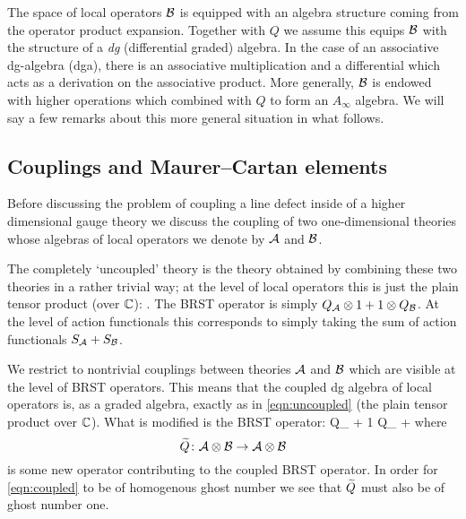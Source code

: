 \documentclass[11pt]{amsart}
\begin{document}
The space of local operators $\mathcal B$ is equipped with an algebra structure coming from the operator product expansion. 
Together with $Q$ we assume this equips $\mathcal B$ with the structure of a {\em dg} (differential graded) algebra. In the case of an associative dg-algebra (dga), there is an associative multiplication and a differential which acts as a derivation on the associative product. 
More generally, $\mathcal B$ is endowed with higher operations which combined with $Q$ to form an $A_\infty$ algebra. 
We will say a few remarks about this more general situation in what follows. 



\subsection{Couplings and Maurer--Cartan elements} 

Before discussing the problem of coupling a line defect inside of a higher dimensional gauge theory we discuss the coupling of two one-dimensional theories whose algebras of local operators we denote by $\mathcal A$ and $\mathcal B$. 

The completely `uncoupled' theory is the theory obtained by combining these two 
theories in a rather trivial way; at the level of local operators this is just the plain tensor product (over $\mathbb C$):
\beqn\label{eqn:uncoupled}
\cA \otimes \cB .
\eeqn
The BRST operator is simply $Q_\mathcal A \otimes 1 + 1 \otimes Q_\mathcal B$.
At the level of action functionals this corresponds to simply taking the sum of action functionals $S_{\mathcal A} + S_{\mathcal B}$. 

We restrict to nontrivial couplings between theories $\mathcal A$ and $\mathcal B$ which are visible at the level of BRST operators. 
This means that the coupled dg algebra of local operators is, as a graded algebra, exactly as in \eqref{eqn:uncoupled} (the plain tensor product over $\mathbb C$). 
What is modified is the BRST operator: 
\beqn\label{eqn:coupled}
Q_{\cA}  + 1 \otimes Q_{\cB} + 
\eeqn
where 
\[
\widetilde{Q} \colon \mathcal A \otimes \mathcal B \to \mathcal A \otimes \mathcal B
\]
is some new operator contributing to the coupled BRST operator. 
In order for \eqref{eqn:coupled} to be of homogenous ghost number we see that $\widetilde{Q}$ must also be of ghost number one.
\end{document}

